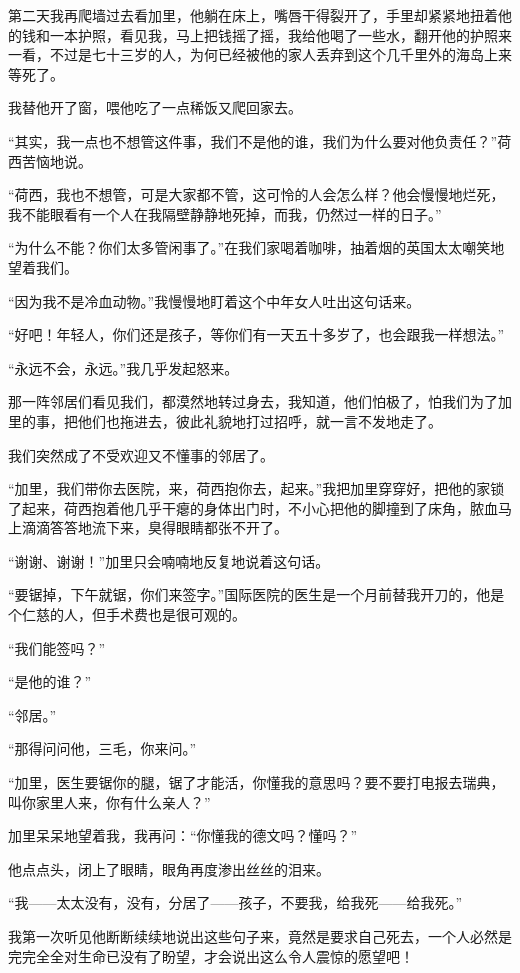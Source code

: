 \par 第二天我再爬墙过去看加里，他躺在床上，嘴唇干得裂开了，手里却紧紧地扭着他的钱和一本护照，看见我，马上把钱摇了摇，我给他喝了一些水，翻开他的护照来一看，不过是七十三岁的人，为何已经被他的家人丢弃到这个几千里外的海岛上来等死了。
\par 我替他开了窗，喂他吃了一点稀饭又爬回家去。
\par “其实，我一点也不想管这件事，我们不是他的谁，我们为什么要对他负责任？”荷西苦恼地说。
\par “荷西，我也不想管，可是大家都不管，这可怜的人会怎么样？他会慢慢地烂死，我不能眼看有一个人在我隔壁静静地死掉，而我，仍然过一样的日子。”
\par “为什么不能？你们太多管闲事了。”在我们家喝着咖啡，抽着烟的英国太太嘲笑地望着我们。
\par “因为我不是冷血动物。”我慢慢地盯着这个中年女人吐出这句话来。
\par “好吧！年轻人，你们还是孩子，等你们有一天五十多岁了，也会跟我一样想法。”
\par “永远不会，永远。”我几乎发起怒来。
\par 那一阵邻居们看见我们，都漠然地转过身去，我知道，他们怕极了，怕我们为了加里的事，把他们也拖进去，彼此礼貌地打过招呼，就一言不发地走了。
\par 我们突然成了不受欢迎又不懂事的邻居了。
\par “加里，我们带你去医院，来，荷西抱你去，起来。”我把加里穿穿好，把他的家锁了起来，荷西抱着他几乎干瘪的身体出门时，不小心把他的脚撞到了床角，脓血马上滴滴答答地流下来，臭得眼睛都张不开了。
\par “谢谢、谢谢！”加里只会喃喃地反复地说着这句话。
\par “要锯掉，下午就锯，你们来签字。”国际医院的医生是一个月前替我开刀的，他是个仁慈的人，但手术费也是很可观的。
\par “我们能签吗？”
\par “是他的谁？”
\par “邻居。”
\par “那得问问他，三毛，你来问。”
\par “加里，医生要锯你的腿，锯了才能活，你懂我的意思吗？要不要打电报去瑞典，叫你家里人来，你有什么亲人？”
\par 加里呆呆地望着我，我再问：“你懂我的德文吗？懂吗？”
\par 他点点头，闭上了眼睛，眼角再度渗出丝丝的泪来。
\par “我——太太没有，没有，分居了——孩子，不要我，给我死——给我死。”
\par 我第一次听见他断断续续地说出这些句子来，竟然是要求自己死去，一个人必然是完完全全对生命已没有了盼望，才会说出这么令人震惊的愿望吧！
